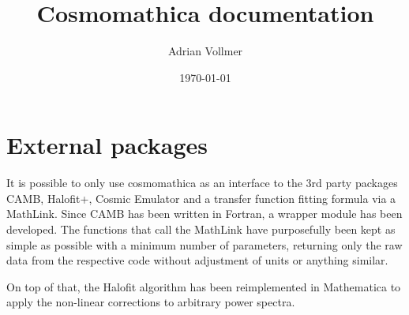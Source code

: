 \documentclass{article}
\author{Adrian Vollmer}
\title{Cosmomathica documentation}
\date{\today}
\begin{document}
\maketitle


% 
% 

\section{External packages}

It is possible to only use cosmomathica as an interface to the 3rd party
packages CAMB\cite{Lewis}, Halofit+\cite{Smith}, Cosmic Emulator\cite{we}
and a transfer function fitting formula\cite{EisensteinHu} via a MathLink.
Since CAMB has been written in Fortran, a wrapper module has been developed.
The functions that call the MathLink have purposefully been kept as simple
as possible with a minimum number of parameters, returning only the raw data
from the respective code without adjustment of units or anything similar.


On top of that, the Halofit algorithm has been reimplemented in Mathematica
to apply the non-linear corrections to arbitrary power spectra.
\end{document}
